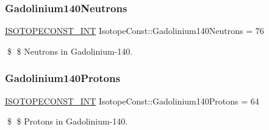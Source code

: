 \subsubsection{\texorpdfstring{Gadolinium140\+Neutrons}{Gadolinium140Neutrons}}
{\footnotesize\ttfamily \mbox{\hyperlink{group___isotope_const-_macros_ga5f18360b3e99483a35c32d789e62621c}{I\+S\+O\+T\+O\+P\+E\+C\+O\+N\+S\+T\+\_\+\+I\+NT}} Isotope\+Const\+::\+Gadolinium140\+Neutrons = 76}

\$ \$ Neutrons in Gadolinium-\/140. \mbox{\label{group___isotope_const-_gadolinium-_gd140_gaec93ae0f03365b84d3d09b6d1f717f3c}} 
\subsubsection{\texorpdfstring{Gadolinium140\+Protons}{Gadolinium140Protons}}
{\footnotesize\ttfamily \mbox{\hyperlink{group___isotope_const-_macros_ga5f18360b3e99483a35c32d789e62621c}{I\+S\+O\+T\+O\+P\+E\+C\+O\+N\+S\+T\+\_\+\+I\+NT}} Isotope\+Const\+::\+Gadolinium140\+Protons = 64}

\$ \$ Protons in Gadolinium-\/140. 
